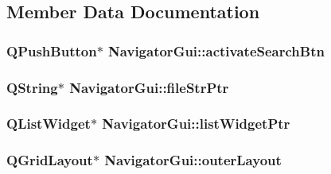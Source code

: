 \subsection{Member Data Documentation}
\hypertarget{class_navigator_gui_a8256fec3fdcad7fea838c7ba701e3d6e}{
\subsubsection[{activate\-Search\-Btn}]{\setlength{\rightskip}{0pt plus 5cm}Q\-Push\-Button$\ast$ Navigator\-Gui\-::activate\-Search\-Btn\hspace{0.3cm}{\ttfamily [private]}}}\label{class_navigator_gui_a8256fec3fdcad7fea838c7ba701e3d6e}
\hypertarget{class_navigator_gui_aa233c8e6f7634b4de98b2dcaaa86ed69}{
\subsubsection[{file\-Str\-Ptr}]{\setlength{\rightskip}{0pt plus 5cm}Q\-String$\ast$ Navigator\-Gui\-::file\-Str\-Ptr\hspace{0.3cm}{\ttfamily [private]}}}\label{class_navigator_gui_aa233c8e6f7634b4de98b2dcaaa86ed69}
\hypertarget{class_navigator_gui_aa3732fbecbd29c6a22eaebe82bb57af7}{
\subsubsection[{list\-Widget\-Ptr}]{\setlength{\rightskip}{0pt plus 5cm}Q\-List\-Widget$\ast$ Navigator\-Gui\-::list\-Widget\-Ptr\hspace{0.3cm}{\ttfamily [private]}}}\label{class_navigator_gui_aa3732fbecbd29c6a22eaebe82bb57af7}
\hypertarget{class_navigator_gui_a0e981a409e2879e799f5e05e0c695f4a}{
\subsubsection[{outer\-Layout}]{\setlength{\rightskip}{0pt plus 5cm}Q\-Grid\-Layout$\ast$ Navigator\-Gui\-::outer\-Layout\hspace{0.3cm}{\ttfamily [private]}}}\label{class_navigator_gui_a0e981a409e2879e799f5e05e0c695f4a}
